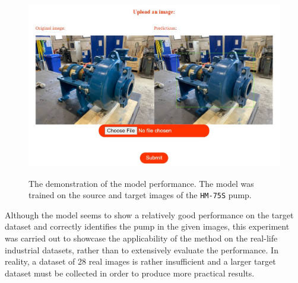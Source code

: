 \begin{figure}[htb]
	\begin{center}
		\includegraphics[width=16cm]{./pump_demo.jpg}
	\end{center}
	\caption{The demonstration of the model performance. The model was trained on the source and target images of the \texttt{HM-75S} pump.}
	\begin{center}\label{pump_demo}
	\end{center}
\end{figure}
\FloatBarrier

Although the model seems to show a relatively good performance on the target dataset and correctly identifies the pump in the given images, this experiment was carried out to showcase the applicability of the method on the real-life industrial datasets, rather than to extensively evaluate the performance. In reality, a dataset of 28 real images is rather insufficient and a larger target dataset must be collected in order to produce more practical results. 


\clearpage

